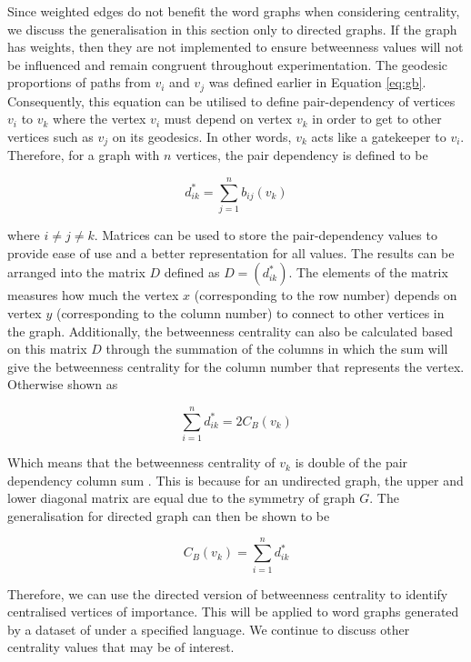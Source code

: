 Since weighted edges do not benefit the word graphs when considering centrality, we discuss the generalisation in this section only to directed graphs. If the graph has weights, then they are not implemented to ensure betweenness values will not be influenced and remain congruent throughout experimentation. The geodesic proportions of paths from $v_i$ and $v_j$ was defined earlier in Equation \ref{eq:gb}. Consequently, this equation can be utilised to define pair-dependency of vertices $v_i$ to $v_k$ where the vertex $v_i$ must depend on vertex $v_k$ in order to get to other vertices such as $v_j$ on its geodesics. In other words, $v_k$ acts like a gatekeeper to $v_i$. Therefore, for a graph with $n$ vertices, the pair dependency is defined to be 

\begin{equation}\label{eq:bcrmv}
d^*_{ik} = \sum_{j=1}^{n}b_{ij}(v_k)
\end{equation}

where $i \ne j \ne k$. Matrices can be used to store the pair-dependency values to provide ease of use and a better representation for all values. The results can be arranged into the matrix $D$ defined as $D = (d^*_{ik})$. The elements of the matrix measures how much the vertex $x$ (corresponding to the row number) depends on vertex $y$ (corresponding to the column number) to connect to other vertices in the graph. Additionally, the betweenness centrality can also be calculated based on this matrix $D$ through the summation of the columns in which the sum will give the betweenness centrality for the column number that represents the vertex. Otherwise shown as

\begin{equation}
\sum_{i=1}^nd^*_{ik} = 2C_B(v_k)
\end{equation}

Which means that the betweenness centrality of $v_k$ is double of the pair dependency column sum \cite{white1994betweenness}. This is because for an undirected graph, the upper and lower diagonal matrix are equal due to the symmetry of graph $G$. The generalisation for directed graph can then be shown to be

\begin{equation}
C_B(v_k) = \sum_{i=1}^nd^*_{ik}
\end{equation}

Therefore, we can use the directed version of betweenness centrality to identify centralised vertices of importance. This will be applied to word graphs generated by a dataset of under a specified language. We continue to discuss other centrality values that may be of interest.

